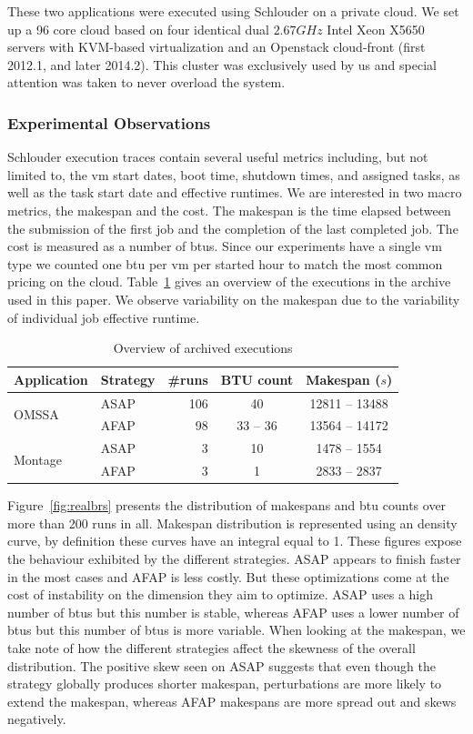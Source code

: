 \documentclass[10pt,conference,compsocconf]{IEEEtran}
\begin{document}
These two applications were executed using Schlouder on a private cloud.  We set
up a 96 core cloud based on four identical  dual $2.67GHz$ Intel Xeon X5650
servers with KVM-based virtualization  and an Openstack cloud-front (first
2012.1, and later 2014.2). This cluster was exclusively used by us and special
attention was taken to never overload the system.

\subsubsection{Experimental Observations}

Schlouder execution traces contain several useful metrics including, but not
limited to, the \ac{vm} start dates, boot time, shutdown times, and assigned
tasks, as well as the task start date and effective runtimes. We are interested in
two macro metrics, the makespan and the cost.  The makespan is the time elapsed
between the submission of the first job and the completion of the last completed
job. The cost is measured as a number of \acp{btu}. Since our experiments have a
single \ac{vm} type we counted one \ac{btu} per \ac{vm} per started hour to
match the most common pricing on the cloud. Table~\ref{tab:nbruns} gives an
overview of the executions in the archive used in this paper. We observe
variability on the makespan due to the variability of individual job effective
runtime.
\begin{table}
	\centering
	\caption{Overview of archived executions}\label{tab:nbruns}
	\begin{tabular}{llrcc}
		\toprule
		Application&Strategy&\#runs&BTU count&Makespan ($s$)\\
		\midrule
		\multirow{2}{*}{OMSSA}&ASAP&106&40&12811 -- 13488\\
				      &AFAP&98&33 -- 36&13564 -- 14172\\
		\midrule
		\multirow{2}{*}{Montage}&ASAP&3&10&1478 -- 1554\\
					&AFAP&3&1&2833 -- 2837\\
		\bottomrule
	\end{tabular}
\end{table}


Figure~\ref{fig:realbrs}  presents the  distribution of  makespans and  \ac{btu}
counts over  more than  200 runs in all. Makespan distribution is represented
using an density curve, by definition these curves have an integral equal to 1.
These figures expose the  behaviour exhibited  by the
different strategies. ASAP  appears to finish faster in the  most cases and AFAP
is less costly. But  these optimizations come at the cost  of instability on the
dimension they  aim to  optimize. ASAP uses  a high number  of \ac{btu}s  but this
number is stable, whereas AFAP uses a lower number of \ac{btu}s  
but this number of \ac{btu}s is  more variable.  When
looking at the makespan, we take note of how the different strategies affect the
skewness of  the overall distribution. The  positive skew seen on  ASAP suggests
that even though  the strategy globally produces  shorter makespan, perturbations
are more likely  to extend the makespan, whereas AFAP  makespans are more spread
out and skews negatively.
\end{document}
